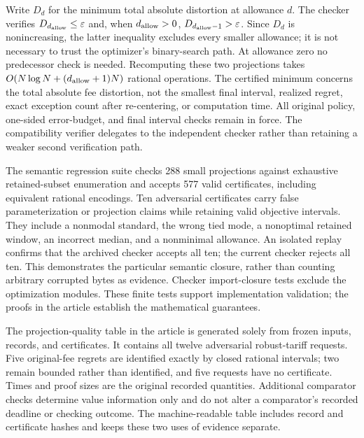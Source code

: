 \documentclass[11pt,letterpaper]{article}
\theoremstyle{definition}\newtheorem{remark}[theorem]{Remark}
\begin{document}
Write $D_d$ for the minimum total absolute distortion at allowance $d$. The checker verifies $D_{d_{\rm allow}}\leq\varepsilon$ and, when $d_{\rm allow}>0$, $D_{d_{\rm allow}-1}>\varepsilon$. Since $D_d$ is nonincreasing, the latter inequality excludes every smaller allowance; it is not necessary to trust the optimizer's binary-search path. At allowance zero no predecessor check is needed. Recomputing these two projections takes $O(N\log N+(d_{\rm allow}+1)N)$ rational operations. The certified minimum concerns the total absolute fee distortion, not the smallest final interval, realized regret, exact exception count after re-centering, or computation time. All original policy, one-sided error-budget, and final interval checks remain in force. The compatibility verifier delegates to the independent checker rather than retaining a weaker second verification path.

The semantic regression suite checks 288 small projections against exhaustive retained-subset enumeration and accepts 577 valid certificates, including equivalent rational encodings. Ten adversarial certificates carry false parameterization or projection claims while retaining valid objective intervals. They include a nonmodal standard, the wrong tied mode, a nonoptimal retained window, an incorrect median, and a nonminimal allowance. An isolated replay confirms that the archived checker accepts all ten; the current checker rejects all ten. This demonstrates the particular semantic closure, rather than counting arbitrary corrupted bytes as evidence. Checker import-closure tests exclude the optimization modules. These finite tests support implementation validation; the proofs in the article establish the mathematical guarantees.

The projection-quality table in the article is generated solely from frozen inputs, records, and certificates. It contains all twelve adversarial robust-tariff requests. Five original-fee regrets are identified exactly by closed rational intervals; two remain bounded rather than identified, and five requests have no certificate. Times and proof sizes are the original recorded quantities. Additional comparator checks determine value information only and do not alter a comparator's recorded deadline or checking outcome. The machine-readable table includes record and certificate hashes and keeps these two uses of evidence separate.
\end{document}
